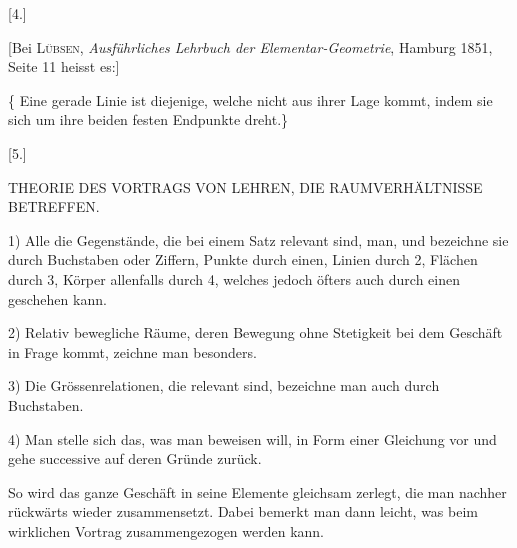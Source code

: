 \begin{center}
[4.]
\end{center}

[Bei \textsc{Lübsen}, \emph{Ausf\"uhrliches Lehrbuch der Elementar-Geometrie}, Hamburg 1851, Seite 11 heisst es:]

\{ Eine gerade Linie ist diejenige, welche nicht aus ihrer Lage kommt, indem sie sich um ihre beiden festen Endpunkte dreht.\}



\begin{center}
[5.]

\textnormal{THEORIE DES VORTRAGS VON LEHREN, DIE RAUMVERH\"ALTNISSE BETREFFEN.}
\end{center}

1) Alle die Gegenst\"ande, die bei einem Satz relevant sind,  man, und bezeichne sie durch Buchstaben oder Ziffern, Punkte durch einen, Linien durch 2, Fl\"achen durch 3, K\"orper allenfalls durch 4, welches jedoch \"ofters auch durch einen geschehen kann.

2) Relativ bewegliche R\"aume, deren Bewegung ohne Stetigkeit bei dem Gesch\"aft in Frage kommt, zeichne man besonders.

3) Die Gr\"ossenrelationen, die relevant sind, bezeichne man auch durch Buchstaben.

4) Man stelle sich das, was man beweisen will, in Form einer Gleichung vor und gehe successive auf deren Gr\"unde zur\"uck.

So wird das ganze Gesch\"aft in seine Elemente gleichsam zerlegt, die man nachher r\"uckw\"arts wieder zusammensetzt. Dabei bemerkt man dann leicht, was beim wirklichen Vortrag zusammengezogen werden kann.

